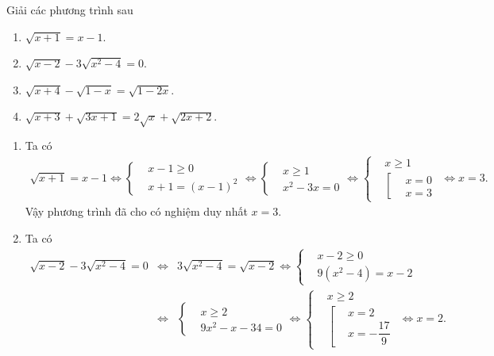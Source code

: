 \begin{vd}
	Giải các phương trình sau
	\begin{multicols}{2}
		\begin{enumerate}
			\item $\sqrt{x+1}=x-1$.
			\item $\sqrt{x-2}-3\sqrt{x^2-4}=0$.
			\item $\sqrt{x+4}-\sqrt{1-x}=\sqrt{1-2x}$.
			\item $\sqrt{x+3}+\sqrt{3x+1}=2\sqrt{x}+\sqrt{2x+2}$.
		\end{enumerate}
	\end{multicols}
	\loigiai
	{
		\begin{enumerate}
			\item Ta có
			\begin{eqnarray*}
				\sqrt{x+1}=x-1 \Leftrightarrow \left\{\begin{aligned}&x-1\geq 0 \\&x+1=(x-1)^2 \end{aligned}\right. \Leftrightarrow \left\{\begin{aligned}&x\geq 1 \\&x^2-3x=0 \end{aligned}\right. \Leftrightarrow \left\{\begin{aligned}&x\geq 1 \\&\left[\begin{aligned}&x=0 \\&x=3 \end{aligned}\right. \end{aligned}\right. \Leftrightarrow x=3.
			\end{eqnarray*}
			Vậy phương trình đã cho có nghiệm duy nhất $x=3$.
			\item Ta có
			\begin{eqnarray*}
				\sqrt{x-2}-3\sqrt{x^2-4}=0 &\Leftrightarrow & 3\sqrt{x^2-4}=\sqrt{x-2} \Leftrightarrow \left\{\begin{aligned}&x-2\geq 0 \\&9(x^2-4)=x-2 \end{aligned}\right.\\
				&\Leftrightarrow & \left\{\begin{aligned}&x\geq 2 \\&9x^2-x-34=0 \end{aligned}\right. \Leftrightarrow \left\{\begin{aligned}&x\geq 2 \\&\left[\begin{aligned}&x=2 \\&x=-\dfrac{17}{9} \end{aligned}\right. \end{aligned}\right. \Leftrightarrow x=2.

\end{eqnarray*}
\end{enumerate}}
\end{vd}
